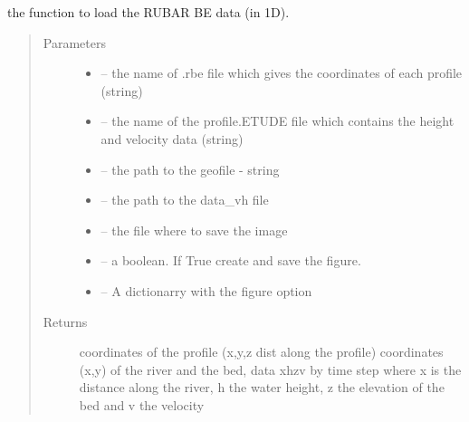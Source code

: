\documentclass[letterpaper,10pt,english]{sphinxmanual}
\begin{document}
\begin{fulllineitems}
\label{\detokenize{index:src.rubar.load_rubar1d}}
the function to load the RUBAR BE data (in 1D).
\begin{quote}\begin{description}
\item[{Parameters}] \leavevmode\begin{itemize}
\item {} 
 -- the name of .rbe file which gives the coordinates of each profile (string)

\item {} 
 -- the name of the profile.ETUDE file which contains the height and velocity data (string)

\item {} 
 -- the path to the geofile - string

\item {} 
 -- the path to the data\_vh file

\item {} 
 -- the file where to save the image

\item {} 
 -- a boolean. If True create and save the figure.

\item {} 
 -- A dictionarry with the figure option

\end{itemize}

\item[{Returns}] \leavevmode
coordinates of the profile (x,y,z dist along the profile) coordinates (x,y) of the river and the bed,
data xhzv by time step where x is the distance along the river, h the water height, z the elevation of the bed
and v the velocity

\end{description}\end{quote}

\end{fulllineitems}

\end{document}
